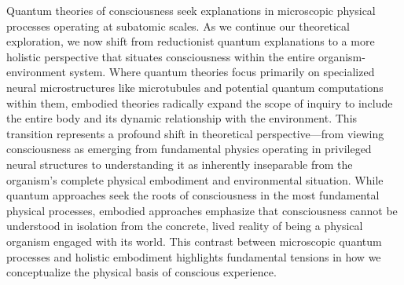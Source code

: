 Quantum theories of consciousness seek explanations in microscopic physical processes operating at subatomic scales. As we continue our theoretical exploration, we now shift from reductionist quantum explanations to a more holistic perspective that situates consciousness within the entire organism-environment system. Where quantum theories focus primarily on specialized neural microstructures like microtubules and potential quantum computations within them, embodied theories radically expand the scope of inquiry to include the entire body and its dynamic relationship with the environment. This transition represents a profound shift in theoretical perspective—from viewing consciousness as emerging from fundamental physics operating in privileged neural structures to understanding it as inherently inseparable from the organism's complete physical embodiment and environmental situation. While quantum approaches seek the roots of consciousness in the most fundamental physical processes, embodied approaches emphasize that consciousness cannot be understood in isolation from the concrete, lived reality of being a physical organism engaged with its world. This contrast between microscopic quantum processes and holistic embodiment highlights fundamental tensions in how we conceptualize the physical basis of conscious experience.
